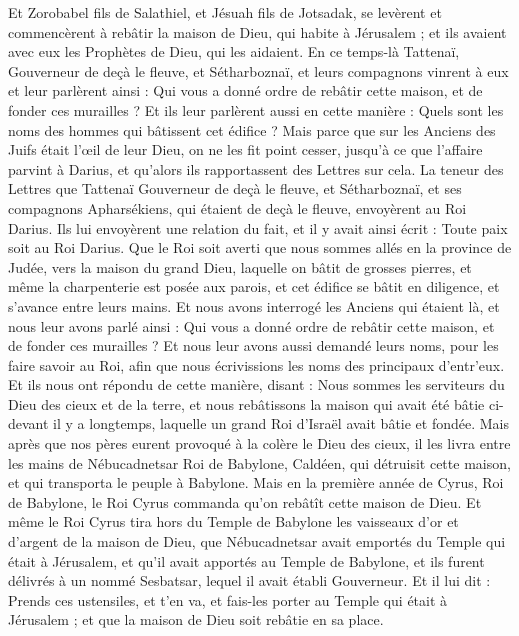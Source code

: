 \begin{multicols}{2}
Et Zorobabel fils de Salathiel, et Jésuah fils de Jotsadak, se levèrent et commencèrent à rebâtir la maison de Dieu, qui habite à Jérusalem ; et ils avaient avec eux les Prophètes de Dieu, qui les aidaient.
En ce temps-là Tattenaï, Gouverneur de deçà le fleuve, et Sétharboznaï, et leurs compagnons vinrent à eux et leur parlèrent ainsi : Qui vous a donné ordre de rebâtir cette maison, et de fonder ces murailles ?
Et ils leur parlèrent aussi en cette manière : Quels sont les noms des hommes qui bâtissent cet édifice ?
Mais parce que sur les Anciens des Juifs était l'œil de leur Dieu, on ne les fit point cesser, jusqu'à ce que l'affaire parvint à Darius, et qu'alors ils rapportassent des Lettres sur cela.
La teneur des Lettres que Tattenaï Gouverneur de deçà le fleuve, et Sétharboznaï, et ses compagnons Apharsékiens, qui étaient de deçà le fleuve, envoyèrent au Roi Darius.
Ils lui envoyèrent une relation du fait, et il y avait ainsi écrit : Toute paix soit au Roi Darius.
Que le Roi soit averti que nous sommes allés en la province de Judée, vers la maison du grand Dieu, laquelle on bâtit de grosses pierres, et même la charpenterie est posée aux parois, et cet édifice se bâtit en diligence, et s'avance entre leurs mains.
Et nous avons interrogé les Anciens qui étaient là, et nous leur avons parlé ainsi : Qui vous a donné ordre de rebâtir cette maison, et de fonder ces murailles ?
Et nous leur avons aussi demandé leurs noms, pour les faire savoir au Roi, afin que nous écrivissions les noms des principaux d'entr'eux.
Et ils nous ont répondu de cette manière, disant : Nous sommes les serviteurs du Dieu des cieux et de la terre, et nous rebâtissons la maison qui avait été bâtie ci-devant il y a longtemps, laquelle un grand Roi d'Israël avait bâtie et fondée.
Mais après que nos pères eurent provoqué à la colère le Dieu des cieux, il les livra entre les mains de Nébucadnetsar Roi de Babylone, Caldéen, qui détruisit cette maison, et qui transporta le peuple à Babylone.
Mais en la première année de Cyrus, Roi de Babylone, le Roi Cyrus commanda qu'on rebâtît cette maison de Dieu.
Et même le Roi Cyrus tira hors du Temple de Babylone les vaisseaux d'or et d'argent de la maison de Dieu, que Nébucadnetsar avait emportés du Temple qui était à Jérusalem, et qu'il avait apportés au Temple de Babylone, et ils furent délivrés à un nommé Sesbatsar, lequel il avait établi Gouverneur.
Et il lui dit : Prends ces ustensiles, et t'en va, et fais-les porter au Temple qui était à Jérusalem ; et que la maison de Dieu soit rebâtie en sa place.

\end{multicols}
